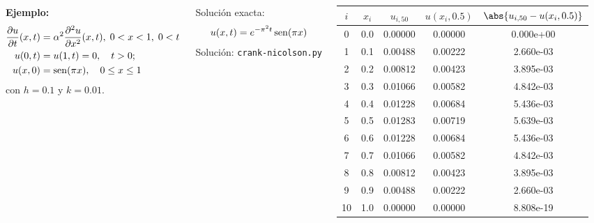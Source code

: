 \documentclass[9pt, aspectratio=169]{beamer}
\begin{document}
\begin{frame}
\begin{columns}
\textbf{Ejemplo:} 
\begin{align*}
\frac{\partial u}{\partial t} (x, t) &= \alpha^2 \frac{\partial^2 u}{\partial x^2}(x, t), \; 0 < x < 1, \; 0 < t \\
u(0, t) &= u(1, t) = 0, \quad t > 0; \\
u(x, 0) &= \operatorname{sen}(\pi x), \quad 0 \leq x \leq 1
\end{align*}
con $h = 0.1$ y \alert{$k = 0.01$}.

Solución exacta:
\[u(x, t) = e^{-\pi^2 t} \operatorname{sen} (\pi x) \]
\centering Solución: \texttt{crank-nicolson.py}

\begin{center}
\begin{tabular}{ccccc}
\toprule
$i$ & $x_i$ & $u_{i,50}$ & $u(x_i, 0.5)$ & $\abs{u_{i, 50} - u(x_i, 0.5)}$ \\
\midrule
0 & 0.0 & 0.00000 & 0.00000 & 0.000e+00 \\
1 & 0.1 & 0.00488 & 0.00222 & 2.660e-03 \\
2 & 0.2 & 0.00812 & 0.00423 & 3.895e-03 \\
3 & 0.3 & 0.01066 & 0.00582 & 4.842e-03 \\
4 & 0.4 & 0.01228 & 0.00684 & 5.436e-03 \\
5 & 0.5 & 0.01283 & 0.00719 & 5.639e-03 \\
6 & 0.6 & 0.01228 & 0.00684 & 5.436e-03 \\
7 & 0.7 & 0.01066 & 0.00582 & 4.842e-03 \\
8 & 0.8 & 0.00812 & 0.00423 & 3.895e-03 \\
9 & 0.9 & 0.00488 & 0.00222 & 2.660e-03 \\
10 & 1.0 & 0.00000 & 0.00000 & 8.808e-19 \\
\bottomrule
\end{tabular} 
\end{center}
\end{columns} 
\end{frame}
\end{document}
